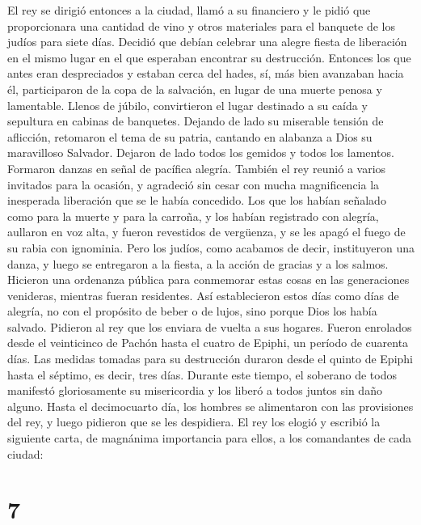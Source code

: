  El rey se dirigió entonces a la ciudad, llamó a su
financiero y le pidió que proporcionara una cantidad de vino y otros
materiales para el banquete de los judíos para siete días. Decidió que
debían celebrar una alegre fiesta de liberación en el mismo lugar en el
que esperaban encontrar su destrucción.  Entonces los que
antes eran despreciados y estaban cerca del hades, sí, más bien
avanzaban hacia él, participaron de la copa de la salvación, en lugar de
una muerte penosa y lamentable. Llenos de júbilo, convirtieron el lugar
destinado a su caída y sepultura en cabinas de banquetes.
 Dejando de lado su miserable tensión de aflicción,
retomaron el tema de su patria, cantando en alabanza a Dios su
maravilloso Salvador. Dejaron de lado todos los gemidos y todos los
lamentos. Formaron danzas en señal de pacífica alegría. 
También el rey reunió a varios invitados para la ocasión, y agradeció
sin cesar con mucha magnificencia la inesperada liberación que se le
había concedido.  Los que los habían señalado como para
la muerte y para la carroña, y los habían registrado con alegría,
aullaron en voz alta, y fueron revestidos de vergüenza, y se les apagó
el fuego de su rabia con ignominia.  Pero los judíos,
como acabamos de decir, instituyeron una danza, y luego se entregaron a
la fiesta, a la acción de gracias y a los salmos. 
Hicieron una ordenanza pública para conmemorar estas cosas en las
generaciones venideras, mientras fueran residentes. Así establecieron
estos días como días de alegría, no con el propósito de beber o de
lujos, sino porque Dios los había salvado.  Pidieron al
rey que los enviara de vuelta a sus hogares.  Fueron
enrolados desde el veinticinco de Pachón hasta el cuatro de Epiphi, un
período de cuarenta días. Las medidas tomadas para su destrucción
duraron desde el quinto de Epiphi hasta el séptimo, es decir, tres días.
 Durante este tiempo, el soberano de todos manifestó
gloriosamente su misericordia y los liberó a todos juntos sin daño
alguno.  Hasta el decimocuarto día, los hombres se
alimentaron con las provisiones del rey, y luego pidieron que se les
despidiera.  El rey los elogió y escribió la siguiente
carta, de magnánima importancia para ellos, a los comandantes de cada
ciudad:

\hypertarget{section-6}{%
\section{7}\label{section-6}}

